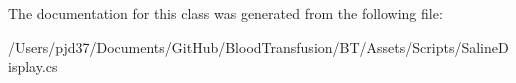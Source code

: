 The documentation for this class was generated from the following file\+:\begin{DoxyCompactItemize}
\item 
/\+Users/pjd37/\+Documents/\+Git\+Hub/\+Blood\+Transfusion/\+B\+T/\+Assets/\+Scripts/Saline\+Display.\+cs\end{DoxyCompactItemize}
